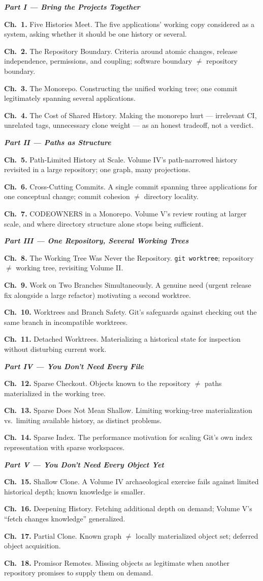 \documentclass[11pt]{book}
\newcommand{\subheading}[1]{\bigskip\noindent{\bfseries\itshape #1}\smallskip\par}
\newcommand{\chapentry}[2]{\noindent\textbf{Ch.~#1.} #2\par\smallskip}
\newcommand{\partheading}[1]{\bigskip\noindent\textbf{\textit{#1}}\smallskip\par}
\begin{document}
\subheading{Chapter Outline}

\partheading{Part I --- Bring the Projects Together}
\chapentry{1}{Five Histories Meet. The five applications' working copy considered as a system, asking whether it should be one history or several.}
\chapentry{2}{The Repository Boundary. Criteria around atomic changes, release independence, permissions, and coupling; software boundary $\neq$ repository boundary.}
\chapentry{3}{The Monorepo. Constructing the unified working tree; one commit legitimately spanning several applications.}
\chapentry{4}{The Cost of Shared History. Making the monorepo hurt --- irrelevant CI, unrelated tags, unnecessary clone weight --- as an honest tradeoff, not a verdict.}

\partheading{Part II --- Paths as Structure}
\chapentry{5}{Path-Limited History at Scale. Volume IV's path-narrowed history revisited in a large repository; one graph, many projections.}
\chapentry{6}{Cross-Cutting Commits. A single commit spanning three applications for one conceptual change; commit cohesion $\neq$ directory locality.}
\chapentry{7}{CODEOWNERS in a Monorepo. Volume V's review routing at larger scale, and where directory structure alone stops being sufficient.}

\partheading{Part III --- One Repository, Several Working Trees}
\chapentry{8}{The Working Tree Was Never the Repository. \texttt{git worktree}; repository $\neq$ working tree, revisiting Volume II.}
\chapentry{9}{Work on Two Branches Simultaneously. A genuine need (urgent release fix alongside a large refactor) motivating a second worktree.}
\chapentry{10}{Worktrees and Branch Safety. Git's safeguards against checking out the same branch in incompatible worktrees.}
\chapentry{11}{Detached Worktrees. Materializing a historical state for inspection without disturbing current work.}

\partheading{Part IV --- You Don't Need Every File}
\chapentry{12}{Sparse Checkout. Objects known to the repository $\neq$ paths materialized in the working tree.}
\chapentry{13}{Sparse Does Not Mean Shallow. Limiting working-tree materialization vs.\ limiting available history, as distinct problems.}
\chapentry{14}{Sparse Index. The performance motivation for scaling Git's own index representation with sparse workspaces.}

\partheading{Part V --- You Don't Need Every Object Yet}
\chapentry{15}{Shallow Clone. A Volume IV archaeological exercise fails against limited historical depth; known knowledge is smaller.}
\chapentry{16}{Deepening History. Fetching additional depth on demand; Volume V's ``fetch changes knowledge'' generalized.}
\chapentry{17}{Partial Clone. Known graph $\neq$ locally materialized object set; deferred object acquisition.}
\chapentry{18}{Promisor Remotes. Missing objects as legitimate when another repository promises to supply them on demand.}
\end{document}
